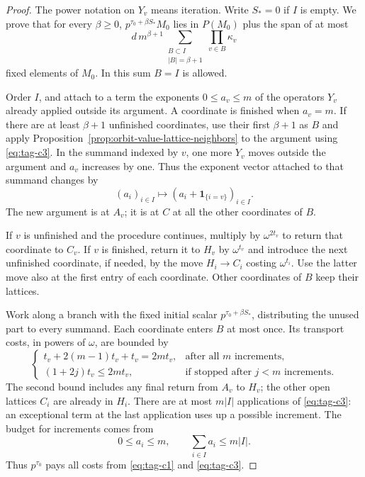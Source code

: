 \begin{proof}
The power notation on \(Y_v\) means iteration. Write \(S_*=0\) if
\(I\) is empty. We prove that for every \(\beta\ge0\),
\(p^{\tau_0+\beta S_*}M_0\) lies in \(P(M_0)\) plus the span of
at most
\[
             d\,m^{\beta+1}
               \sum_{\substack{B\subset I\\|B|=\beta+1}}
                     \prod_{v\in B}\kappa_v                      \tag{C4}\label{eq:tag-c4}
\]
fixed elements of \(M_0\). In this sum \(B=I\) is allowed.


Order \(I\), and attach to a term the exponents \(0\le a_v\le m\)
of the operators \(Y_v\) already applied outside its argument.
A coordinate is finished when \(a_v=m\). If there are at least
\(\beta+1\) unfinished coordinates, use their first \(\beta+1\)
as \(B\) and apply Proposition~\ref{prop:orbit-value-lattice-neighbors}
to the argument using \textup{\eqref{eq:tag-c3}}. In the summand indexed
by \(v\), one more \(Y_v\) moves outside the argument and \(a_v\)
increases by one.
Thus the exponent vector attached to that summand changes by
\[
  (a_i)_{i\in I}\longmapsto(a_i+\mathbf1_{\{i=v\}})_{i\in I}.
\]
 The new argument is at \(A_v\); it is at \(C\)
at all the other coordinates of \(B\).

If \(v\) is unfinished
and the procedure continues, multiply by \(\omega^{2t_v}\) to
return that coordinate to \(C_v\). If \(v\) is finished, return it
to \(H_v\) by \(\omega^{t_v}\) and introduce the next unfinished
coordinate, if needed, by the move \(H_i\to C_i\) costing
\(\omega^{t_i}\). Use the latter move also at the first entry of
each coordinate. Other coordinates of \(B\) keep their lattices.


Work along a branch with the fixed initial scalar
\(p^{\tau_0+\beta S_*}\), distributing the unused part to
every summand. Each coordinate enters \(B\) at most once.
Its transport costs, in powers of \(\omega\), are bounded by
\[
 \begin{cases}
 t_v+2(m-1)t_v+t_v=2mt_v,&\text{after all \(m\) increments},\\
 (1+2j)t_v\le2mt_v,&\text{if stopped after \(j<m\) increments}.
 \end{cases}
\]
The second bound includes any final return from \(A_v\) to
\(H_v\); the other open lattices \(C_i\) are already in \(H_i\).
There are at most \(m|I|\) applications of \eqref{eq:tag-c3}: an exceptional
term at the last application uses up a possible increment.
The budget for increments comes from
\[
  0\le a_i\le m,\qquad \sum_{i\in I}a_i\le m|I| .
\]
Thus \(p^{\tau_0}\) pays all costs from \eqref{eq:tag-c1} and \eqref{eq:tag-c3}.


\end{proof}
